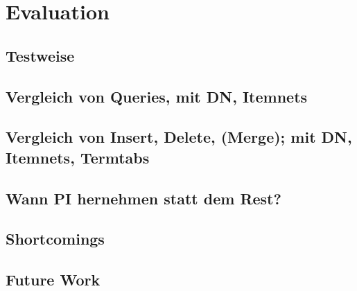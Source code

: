 \chapter{Evaluation}
\section{Testweise}
\section{Vergleich von Queries, mit DN, Itemnets}
\section{Vergleich von Insert, Delete, (Merge); mit DN, Itemnets, Termtabs}
\section{Wann PI hernehmen statt dem Rest?}
\section{Shortcomings}
\section{Future Work}
